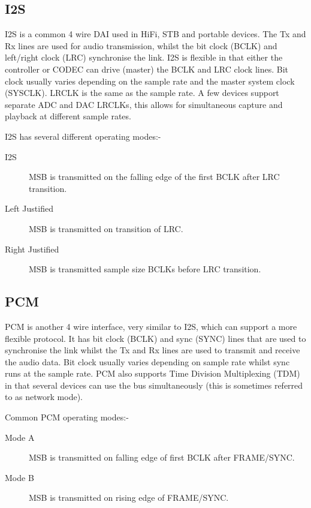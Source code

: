 \documentclass[a4paper,8pt,english]{sphinxmanual}
\begin{document}
\subsection{I2S}
\label{sound/soc/dai:i2s}
I2S is a common 4 wire DAI used in HiFi, STB and portable devices. The Tx and
Rx lines are used for audio transmission, whilst the bit clock (BCLK) and
left/right clock (LRC) synchronise the link. I2S is flexible in that either the
controller or CODEC can drive (master) the BCLK and LRC clock lines. Bit clock
usually varies depending on the sample rate and the master system clock
(SYSCLK). LRCLK is the same as the sample rate. A few devices support separate
ADC and DAC LRCLKs, this allows for simultaneous capture and playback at
different sample rates.

I2S has several different operating modes:-
\begin{description}
\item[{I2S}] \leavevmode
MSB is transmitted on the falling edge of the first BCLK after LRC
transition.

\item[{Left Justified}] \leavevmode
MSB is transmitted on transition of LRC.

\item[{Right Justified}] \leavevmode
MSB is transmitted sample size BCLKs before LRC transition.

\end{description}


\subsection{PCM}
\label{sound/soc/dai:pcm}
PCM is another 4 wire interface, very similar to I2S, which can support a more
flexible protocol. It has bit clock (BCLK) and sync (SYNC) lines that are used
to synchronise the link whilst the Tx and Rx lines are used to transmit and
receive the audio data. Bit clock usually varies depending on sample rate
whilst sync runs at the sample rate. PCM also supports Time Division
Multiplexing (TDM) in that several devices can use the bus simultaneously (this
is sometimes referred to as network mode).

Common PCM operating modes:-
\begin{description}
\item[{Mode A}] \leavevmode
MSB is transmitted on falling edge of first BCLK after FRAME/SYNC.

\item[{Mode B}] \leavevmode
MSB is transmitted on rising edge of FRAME/SYNC.

\end{description}
\end{document}
